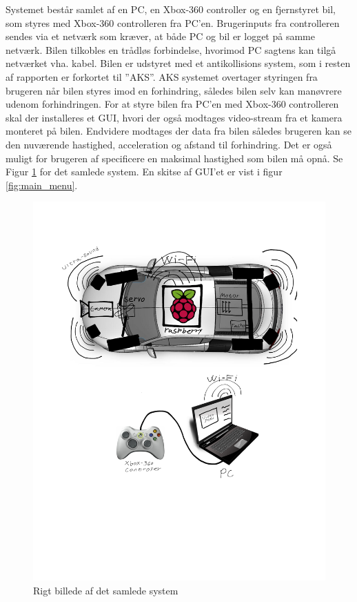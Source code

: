 Systemet består samlet af en PC, en Xbox-360 controller og en fjernstyret bil, som styres med Xbox-360 controlleren fra PC'en. Brugerinputs fra controlleren sendes via et netværk som kræver, at både PC og bil er logget på samme netværk. Bilen tilkobles en trådløs forbindelse, hvorimod PC sagtens kan tilgå netværket vha. kabel. Bilen er udstyret med et antikollisions system, som i resten af rapporten er forkortet til ''AKS''. AKS systemet overtager styringen fra brugeren når bilen styres imod en forhindring, således bilen selv kan manøvrere udenom forhindringen. For at styre bilen fra PC'en med Xbox-360 controlleren skal der installeres et GUI, hvori der også modtages video-stream fra et kamera monteret på bilen. Endvidere modtages der data fra bilen således brugeren kan se den nuværende hastighed, acceleration og afstand til forhindring. Det er også muligt for brugeren af specificere en maksimal hastighed som bilen må opnå. Se Figur \ref{fig:rigbillede} for det samlede system. En skitse af GUI'et er vist i figur \ref{fig:main_menu}.
\begin{figure}[H]
\centering
\includegraphics[width=\textwidth - 7.38 cm]{../fig/billeder/rigbillede}
\caption{Rigt billede af det samlede system}
\label{fig:rigbillede}
\end{figure} 
